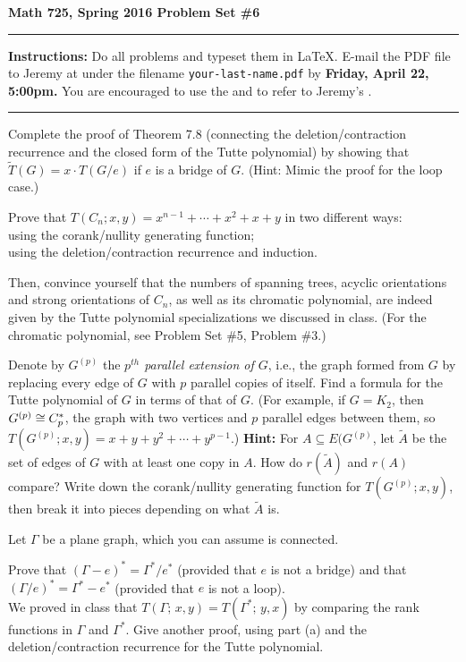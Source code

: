 

\thispagestyle{empty}
{\bf Math 725, Spring 2016 \hfill Problem Set \#6}
\smallskip\hrule

{\bf Instructions:} Do all problems and typeset them in \LaTeX.  E-mail the PDF file to Jeremy at  under the filename {\tt your-last-name.pdf} by {\bf Friday, April 22, 5:00pm.}
You are encouraged to use the  and to refer to Jeremy's .

\smallskip\hrule

\prob Complete the proof of Theorem 7.8 (connecting the deletion/contraction recurrence and the closed form of the Tutte polynomial) by showing that $\tilde T(G)=x\cdot T(G/e)$ if $e$ is a bridge of $G$.  (Hint: Mimic the proof for the loop case.)

\prob Prove that $T(C_n;x,y)=x^{n-1}+\cdots+x^2+x+y$ in two different ways:\\
\probpart using the corank/nullity generating function;\\
\probpart using the deletion/contraction recurrence and induction.

Then, convince yourself that the numbers of spanning trees, acyclic orientations and strong orientations of $C_n$, as well as its chromatic polynomial, are indeed given by the Tutte polynomial specializations we discussed in class.  (For the chromatic polynomial, see Problem Set \#5, Problem \#3.)
 
\prob Denote by $G^{(p)}$ the \emph{$p^{th}$ parallel extension of $G$}, i.e., the graph formed from $G$ by replacing every edge of $G$ with $p$ parallel copies of itself.  Find a formula for the Tutte polynomial of $G$ in terms of that of $G$.  (For example, if $G=K_2$, then $G^{(p)}\cong C_p^*$, the graph with two vertices and $p$ parallel edges between them, so $T(G^{(p)};x,y)=x+y+y^2+\cdots+y^{p-1}$.)  {\bf Hint:} For $A\subseteq E(G^{(p)}$, let $\tilde A$ be the set of edges of $G$ with at least one copy in $A$.  How do $r(\tilde A)$ and $r(A)$ compare?  Write down the corank/nullity generating function for $T(G^{(p)};x,y)$, then break it into pieces depending on what $\tilde A$ is.

\prob Let $\Gamma$ be a plane graph, which you can assume is connected.

\probpart Prove that $(\Gamma-e)^*=\Gamma^*/e^*$ (provided that $e$ is not a bridge) and that $(\Gamma/e)^*=\Gamma^*-e^*$ (provided that $e$ is not a loop).\\
\probpart We proved in class that $T(\Gamma;\,x,y)=T(\Gamma^*;\,y,x)$ by comparing the rank functions in $\Gamma$ and $\Gamma^*$.  Give another proof, using part (a) and the deletion/contraction recurrence for the Tutte polynomial.

